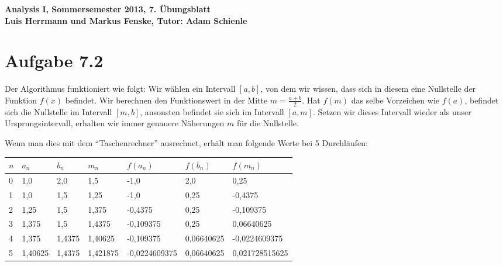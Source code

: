 \documentclass[a4paper,german,12pt,smallheadings]{scrartcl}
\begin{document}
\begin{center}
\bfseries %
\sffamily %
\vspace{-40pt}
Analysis I, Sommersemester 2013, 7. Übungsblatt \\
Luis Herrmann und Markus Fenske, Tutor: Adam Schienle
\vspace{-10pt}
\end{center}

\section{Aufgabe 7.2}

Der Algorithmus funktioniert wie folgt: Wir wählen ein Intervall $[a,b]$, von
dem wir wissen, dass sich in diesem eine Nullstelle der Funktion $f(x)$
befindet. Wir berechnen den Funktionswert in der Mitte $m = \frac{a+b}{2}$. Hat
$f(m)$ das selbe Vorzeichen wie $f(a)$, befindet sich die Nullstelle im
Intervall $[m, b]$, ansonsten befindet sie sich im Intervall $[a, m]$. Setzen
wir dieses Intervall wieder als unser Ursprungsintervall, erhalten wir immer
genauere Näherungen $m$ für die Nullstelle.

Wenn man dies mit dem ``Taschenrechner'' ausrechnet,
erhält man folgende Werte bei 5 Durchläufen:

\vspace{20pt}
\begin{tabular}{lllllll}
\hline
$n$ & $a_n$   & $b_n$ & $m_n$ & $f(a_n)$ & $f(b_n)$ & $f(m_n)$ \\ \hline
0 & 1{,}0 & 2{,}0 & 1{,}5 & -1{,}0 & 2{,}0 & 0{,}25 \\
1 & 1{,}0 & 1{,}5 & 1{,}25 & -1{,}0 & 0{,}25 & -0{,}4375 \\
2 & 1{,}25 & 1{,}5 & 1{,}375 & -0{,}4375 & 0{,}25 & -0{,}109375 \\
3 & 1{,}375 & 1{,}5 & 1{,}4375 & -0{,}109375 & 0{,}25 & 0{,}06640625 \\
4 & 1{,}375 & 1{,}4375 & 1{,}40625 & -0{,}109375 & 0{,}06640625 & -0{,}0224609375 \\
5 & 1{,}40625 & 1{,}4375 & 1{,}421875 & -0{,}0224609375 & 0{,}06640625 & 0{,}021728515625 \\
\hline
\end{tabular}
\vspace{20pt}
\end{document}
